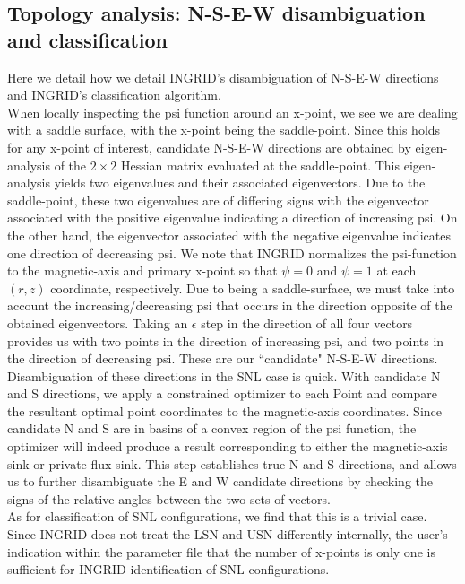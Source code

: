 \subsection{Topology analysis: N-S-E-W disambiguation and classification}
Here we detail how we detail INGRID's disambiguation of N-S-E-W directions and INGRID's classification algorithm.\\ \indent
When locally inspecting the psi function around an x-point, we see we are dealing with a saddle surface, with the x-point being the saddle-point. Since this holds for any x-point of interest, candidate N-S-E-W directions are obtained by eigen-analysis of the $2\times2$ Hessian matrix evaluated at the saddle-point. This eigen-analysis yields two eigenvalues and their associated eigenvectors. Due to the saddle-point, these two eigenvalues are of differing signs with the eigenvector associated with the positive eigenvalue indicating a direction of increasing psi. On the other hand, the eigenvector associated with the negative eigenvalue indicates one direction of decreasing psi. We note that INGRID normalizes the psi-function to the magnetic-axis and primary x-point so that $\psi = 0$ and $\psi=1$ at each $(r,z)$ coordinate, respectively. Due to being a saddle-surface, we must take into account the increasing/decreasing psi that occurs in the direction opposite of the obtained eigenvectors. Taking an $\epsilon$ step in the direction of all four vectors provides us with two points in the direction of increasing psi, and two points in the direction of decreasing psi. These are our ``candidate" N-S-E-W directions.\\ \indent
Disambiguation of these directions in the SNL case is quick. With candidate N and S directions, we apply a constrained optimizer to each Point and compare the resultant optimal point coordinates to the magnetic-axis coordinates. Since candidate N and S are in basins of a convex region of the psi function, the optimizer will indeed produce a result corresponding to either the magnetic-axis sink or private-flux sink. This step establishes true N and S directions, and allows us to further disambiguate the E and W candidate directions by checking the signs of the relative angles between the two sets of vectors.\\ \indent
As for classification of SNL configurations, we find that this is a trivial case. Since INGRID does not treat the LSN and USN differently internally, the user's indication within the parameter file that the number of x-points is only one is sufficient for INGRID identification of SNL configurations.\\ \indent
